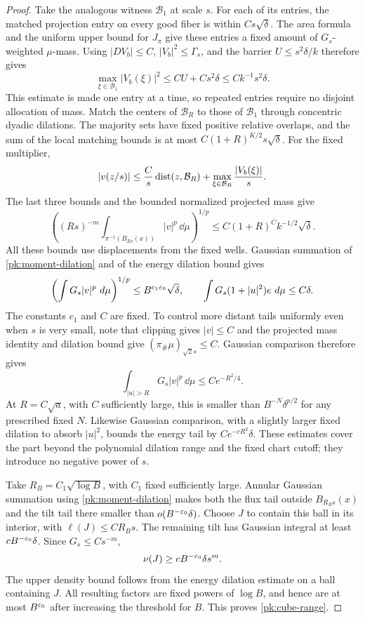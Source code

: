 \begin{proof}
Take the analogous witness $\mathcal B_1$ at scale $s$. For each of
its entries, the matched projection entry on every good fiber is
within $Cs\sqrt\delta$. The area formula and the uniform upper bound
for $J_\pi$ give these entries a fixed amount of $G_s$-weighted
$\mu$-mass. Using $|DV_b|\le C$, $|V_b|^2\le\Gamma_s$, and the
barrier $U\le s^2\delta/k$ therefore gives
\[
 \max_{\xi\in\mathcal B_1}|V_b(\xi)|^2
 \le C U+Cs^2\delta
 \le Ck^{-1}s^2\delta.
\]
This estimate is made one entry at a time, so repeated entries require
no disjoint allocation of mass. Match the centers of $\mathcal B_R$
to those of $\mathcal B_1$ through concentric dyadic dilations.
The majority sets have fixed positive relative overlaps, and the sum
of the local matching bounds is at most
$C(1+R)^{K/2}s\sqrt\delta$. For the fixed multiplier,
\[
 |v(z/s)|\le \frac C s\operatorname{dist}(z,\mathcal B_R)
          +\max_{\xi\in\mathcal B_R}\frac{|V_b(\xi)|}{s}.
\]
The last three bounds and the bounded normalized projected mass give
\begin{equation}\label{pk:moment-dilation}
 \left((Rs)^{-m}\int_{\pi^{-1}(B_{Rs}(x))}|v|^p\,\dd\mu
       \right)^{1/p}
 \le C(1+R)^C k^{-1/2}\sqrt\delta.
\end{equation}
All these bounds use displacements from the fixed wells. Gaussian summation of
\eqref{pk:moment-dilation} and of the energy dilation bound
gives
\begin{equation}\label{pk:flux-moments}
 \left(\int G_s|v|^p\,\mathop{}\!d\mu\right)^{1/p}
       \le B^{c_1\varepsilon_0}\sqrt\delta,
 \qquad
 \int G_s(1+|u|^2)e\,\mathop{}\!d\mu\le C\delta.
\end{equation}
The constants $c_1$ and $C$ are fixed.  To control more distant
tails uniformly even when $s$ is very small, note that clipping
gives $|v|\le C$ and the projected mass identity and dilation
bound give $(\pi_\#\mu)_{\sqrt2s}\le C$.  Gaussian comparison
therefore gives
\[
 \int_{|u|>R}G_s|v|^p\,\dd\mu\le Ce^{-R^2/4}.
\]
At $R=C\sqrt a$, with $C$ sufficiently large, this is
smaller than $B^{-N}\delta^{p/2}$ for any prescribed fixed
$N$.  Likewise Gaussian comparison, with a slightly larger
fixed dilation to absorb $|u|^2$, bounds the energy tail by
$Ce^{-cR^2}\delta$.  These estimates cover the part beyond
the polynomial dilation range and the fixed chart cutoff;
they introduce no negative power of $s$.

Take $R_B=C_1\sqrt{\log B}$, with $C_1$ fixed sufficiently
large.  Annular Gaussian summation using
\eqref{pk:moment-dilation} makes both the flux tail outside
$B_{R_Bs}(x)$ and the tilt tail there smaller than
$o(B^{-\varepsilon_0}\delta)$.  Choose $J$ to contain this ball in
its interior, with $\ell(J)\le C R_Bs$.
The remaining tilt has Gaussian integral at least
$cB^{-\varepsilon_0}\delta$.  Since $G_s\le Cs^{-m}$,
\[
 \nu(J)\ge cB^{-\varepsilon_0}\delta s^m.
\]
The upper density bound follows from the energy dilation
estimate on a ball containing $J$.  All resulting factors are
fixed powers of $\log B$, and hence are at most $B^{\varepsilon_0}$
after increasing the threshold for $B$.  This proves
\eqref{pk:cube-range}.


\end{proof}

